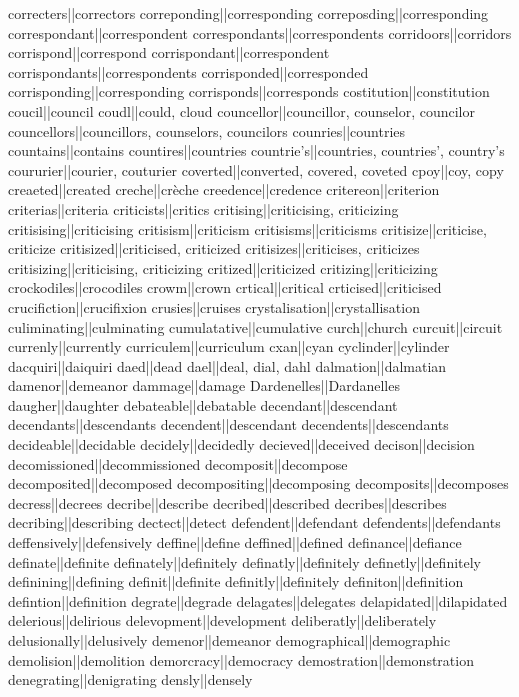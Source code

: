 correcters||correctors
correponding||corresponding
correposding||corresponding
correspondant||correspondent
correspondants||correspondents
corridoors||corridors
corrispond||correspond
corrispondant||correspondent
corrispondants||correspondents
corrisponded||corresponded
corrisponding||corresponding
corrisponds||corresponds
costitution||constitution
coucil||council
coudl||could, cloud
councellor||councillor, counselor, councilor
councellors||councillors, counselors, councilors
counries||countries
countains||contains
countires||countries
countrie's||countries, countries', country's
coururier||courier, couturier
coverted||converted, covered, coveted
cpoy||coy, copy
creaeted||created
creche||crèche
creedence||credence
critereon||criterion
criterias||criteria
criticists||critics
critising||criticising, criticizing
critisising||criticising
critisism||criticism
critisisms||criticisms
critisize||criticise, criticize
critisized||criticised, criticized
critisizes||criticises, criticizes
critisizing||criticising, criticizing
critized||criticized
critizing||criticizing
crockodiles||crocodiles
crowm||crown
crtical||critical
crticised||criticised
crucifiction||crucifixion
crusies||cruises
crystalisation||crystallisation
culiminating||culminating
cumulatative||cumulative
curch||church
curcuit||circuit
currenly||currently
curriculem||curriculum
cxan||cyan
cyclinder||cylinder
dacquiri||daiquiri
daed||dead
dael||deal, dial, dahl
dalmation||dalmatian
damenor||demeanor
dammage||damage
Dardenelles||Dardanelles
daugher||daughter
debateable||debatable
decendant||descendant
decendants||descendants
decendent||descendant
decendents||descendants
decideable||decidable
decidely||decidedly
decieved||deceived
decison||decision
decomissioned||decommissioned
decomposit||decompose
decomposited||decomposed
decompositing||decomposing
decomposits||decomposes
decress||decrees
decribe||describe
decribed||described
decribes||describes
decribing||describing
dectect||detect
defendent||defendant
defendents||defendants
deffensively||defensively
deffine||define
deffined||defined
definance||defiance
definate||definite
definately||definitely
definatly||definitely
definetly||definitely
definining||defining
definit||definite
definitly||definitely
definiton||definition
defintion||definition
degrate||degrade
delagates||delegates
delapidated||dilapidated
delerious||delirious
delevopment||development
deliberatly||deliberately
delusionally||delusively
demenor||demeanor
demographical||demographic
demolision||demolition
demorcracy||democracy
demostration||demonstration
denegrating||denigrating
densly||densely
